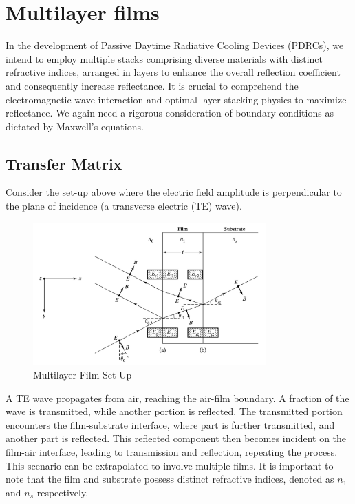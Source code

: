 \section{Multilayer films}
In the development of Passive Daytime Radiative Cooling Devices (PDRCs), we intend to employ multiple stacks comprising diverse materials with distinct refractive indices, arranged in layers to enhance the overall reflection coefficient and consequently increase reflectance. It is crucial to comprehend the electromagnetic wave interaction and optimal layer stacking physics to maximize reflectance. We again need a rigorous consideration of boundary conditions as dictated by Maxwell's equations. %

\subsection{Transfer Matrix}
Consider the set-up above where the electric field amplitude is perpendicular to the plane of incidence (a transverse electric (TE) wave).

\begin{figure}
  \centering
  \includegraphics[width=0.8\textwidth]{Chapters/Figures/Multilayer Film Set-Up.jpeg}
  \caption{Multilayer Film Set-Up}
\end{figure}

A TE wave propagates from air, reaching the air-film boundary. A fraction of the wave is transmitted, while another portion is reflected. The transmitted portion encounters the film-substrate interface, where part is further transmitted, and another part is reflected. This reflected component then becomes incident on the film-air interface, leading to transmission and reflection, repeating the process. This scenario can be extrapolated to involve multiple films. It is important to note that the film and substrate possess distinct refractive indices, denoted as $n_1$ and $n_s$ respectively. %

